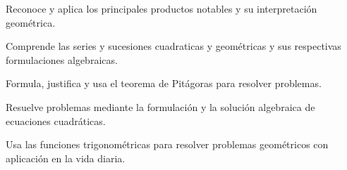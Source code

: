 \item Reconoce y aplica los principales productos notables y su interpretación geométrica.
\item Comprende las series y sucesiones cuadraticas y geométricas y sus respectivas formulaciones algebraicas.
\item Formula, justifica y usa el teorema de Pitágoras para resolver problemas.
\item Resuelve problemas mediante la formulación y la solución algebraica de ecuaciones cuadráticas. 
\item Usa las funciones trigonométricas para resolver problemas geométricos con aplicación en la vida diaria.